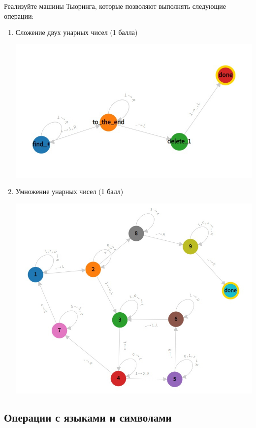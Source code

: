 \documentclass[a4paper,12pt]{article}
\begin{document}
Реализуйте машины Тьюринга, которые позволяют выполнять следующие операции:
\begin{enumerate}
    \item Сложение двух унарных чисел (1 балла)
    
   \includegraphics[scale=0.5]{11hw3.jpg}

    \item Умножение унарных чисел (1 балл)
    
    \includegraphics[scale=0.5]{12hw3.jpg}
\end{enumerate}


\subsection{Операции с языками и символами}
\end{document}
